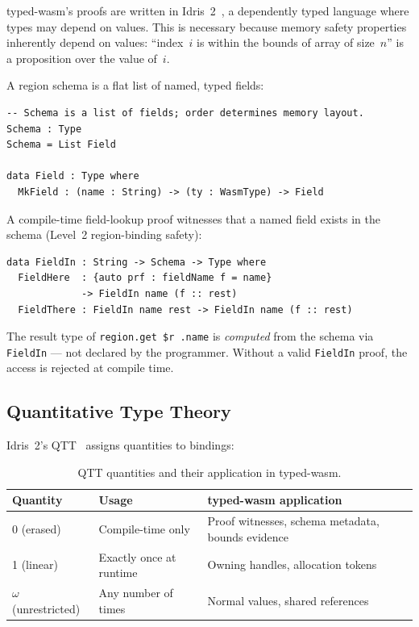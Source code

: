 \documentclass[sigplan,nonacm,screen]{acmart}
\begin{document}
typed-wasm's proofs are written in Idris~2~\cite{brady2021}, a dependently
typed language where types may depend on values. This is necessary because
memory safety properties inherently depend on values: ``index~$i$ is
within the bounds of array of size~$n$'' is a proposition over the value
of~$i$.

A region schema is a flat list of named, typed fields:

\begin{lstlisting}[language=Idris2,caption={Region schema as a list of named fields.}]
-- Schema is a list of fields; order determines memory layout.
Schema : Type
Schema = List Field

data Field : Type where
  MkField : (name : String) -> (ty : WasmType) -> Field
\end{lstlisting}

A compile-time field-lookup proof witnesses that a named field exists
in the schema (Level~2 region-binding safety):

\begin{lstlisting}[language=Idris2,caption={Field-lookup proof for Level~2 region-binding.}]
data FieldIn : String -> Schema -> Type where
  FieldHere  : {auto prf : fieldName f = name}
             -> FieldIn name (f :: rest)
  FieldThere : FieldIn name rest -> FieldIn name (f :: rest)
\end{lstlisting}

The result type of \texttt{region.get \$r .name} is \emph{computed} from
the schema via \texttt{FieldIn} --- not declared by the programmer.
Without a valid \texttt{FieldIn} proof, the access is rejected at compile
time.

\subsection{Quantitative Type Theory}

Idris~2's QTT~\cite{atkey2018,mcbride2016} assigns quantities to bindings:

\begin{table}[ht]
\centering
\caption{QTT quantities and their application in typed-wasm.}
\label{tab:qtt}
\begin{tabular}{@{}lll@{}}
\toprule
\textbf{Quantity} & \textbf{Usage} & \textbf{typed-wasm application} \\
\midrule
0 (erased) & Compile-time only & Proof witnesses, schema metadata, bounds evidence \\
1 (linear) & Exactly once at runtime & Owning handles, allocation tokens \\
$\omega$ (unrestricted) & Any number of times & Normal values, shared references \\
\bottomrule
\end{tabular}
\end{table}
\end{document}
